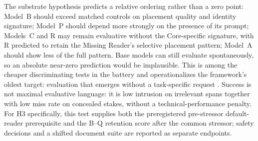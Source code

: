 The substrate hypothesis predicts a relative ordering rather than a zero point:
Model~B should exceed matched controls on placement quality and identity
signature; Model~P should depend more strongly on the presence of its prompt;
Models~C and R may remain evaluative without the Core-specific signature, with
R predicted to retain the Missing Reader's selective placement pattern; Model~A
should show less of the full pattern. Base models can still evaluate
spontaneously, so an absolute near-zero prediction would be implausible. This is
among the cheaper discriminating tests in the battery and operationalizes the
framework's oldest target: evaluation that emerges without a task-specific
request \cite{westerberg2025superintelligence}. Success is not maximal
evaluative language: it is low intrusion on irrelevant spans together with low
miss rate on concealed stakes, without a technical-performance penalty.
For H3 specifically, this test supplies both the preregistered pre-stressor
default-reader prerequisite and the B--Q retention score after the common
stressor; safety decisions and a shifted document suite are reported as
separate endpoints.

